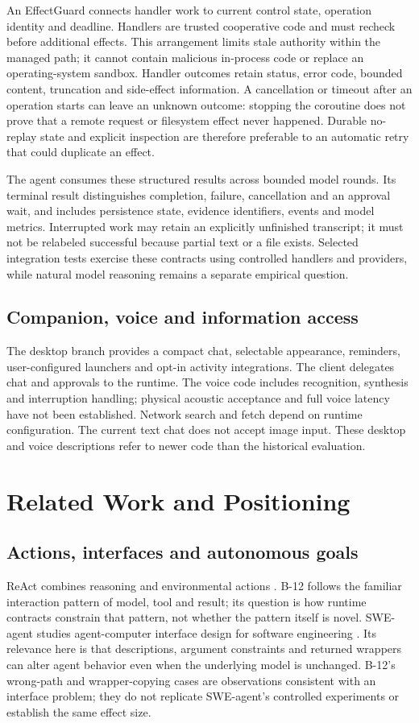 \documentclass[11pt]{article}
\begin{document}
An EffectGuard connects handler work to current control state, operation identity and deadline. Handlers are trusted cooperative code and must recheck before additional effects. This arrangement limits stale authority within the managed path; it cannot contain malicious in-process code or replace an operating-system sandbox. Handler outcomes retain status, error code, bounded content, truncation and side-effect information. A cancellation or timeout after an operation starts can leave an unknown outcome: stopping the coroutine does not prove that a remote request or filesystem effect never happened. Durable no-replay state and explicit inspection are therefore preferable to an automatic retry that could duplicate an effect.

The agent consumes these structured results across bounded model rounds. Its terminal result distinguishes completion, failure, cancellation and an approval wait, and includes persistence state, evidence identifiers, events and model metrics. Interrupted work may retain an explicitly unfinished transcript; it must not be relabeled successful because partial text or a file exists. Selected integration tests exercise these contracts using controlled handlers and providers, while natural model reasoning remains a separate empirical question.

\subsection{Companion, voice and information access}
The desktop branch provides a compact chat, selectable appearance, reminders, user-configured launchers and opt-in activity integrations. The client delegates chat and approvals to the runtime. The voice code includes recognition, synthesis and interruption handling; physical acoustic acceptance and full voice latency have not been established. Network search and fetch depend on runtime configuration. The current text chat does not accept image input. These desktop and voice descriptions refer to newer code than the historical evaluation.


\section{Related Work and Positioning}\label{sec:related}
\subsection{Actions, interfaces and autonomous goals}
ReAct combines reasoning and environmental actions \cite{react}. B-12 follows the familiar interaction pattern of model, tool and result; its question is how runtime contracts constrain that pattern, not whether the pattern itself is novel. SWE-agent studies agent-computer interface design for software engineering \cite{swe}. Its relevance here is that descriptions, argument constraints and returned wrappers can alter agent behavior even when the underlying model is unchanged. B-12's wrong-path and wrapper-copying cases are observations consistent with an interface problem; they do not replicate SWE-agent's controlled experiments or establish the same effect size.
\end{document}
